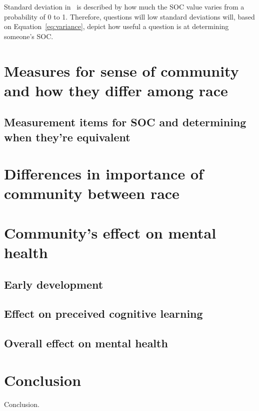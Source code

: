 \documentclass{sig-alternate}
\begin{document}
Standard deviation in~\cite{disparities:2009} is described by how much the SOC value varies from a probability of 0 to 1. Therefore, questions will low standard deviations will, based on Equation~\ref{eq:variance}, depict how useful a question is at determining someone's SOC. 


\section{Measures for sense of community and how they differ among race}


\subsection{Measurement items for SOC and determining when they're equivalent}

\section{Differences in importance of community between race}


\section{Community's effect on mental health}
\subsection{Early development}
\subsection{Effect on preceived cognitive learning}
\subsection{Overall effect on mental health}



\section{Conclusion}
Conclusion.

\nocite{*}



\end{document}
